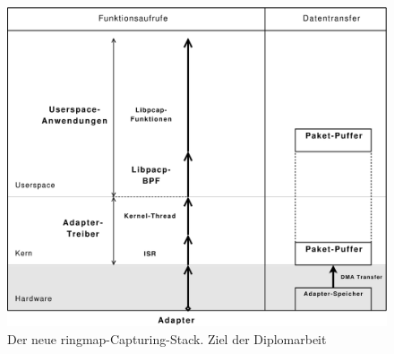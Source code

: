 \begin{figure}
	\begin{center}
	\includegraphics[width=4.9in]{bilder/1copy}
	\end{center}
	\caption{Der neue ringmap-Capturing-Stack. Ziel der Diplomarbeit}
	\label{img:new_stack}
\end{figure}

